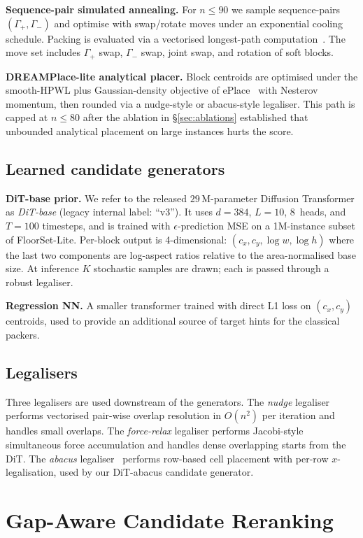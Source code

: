 \documentclass[nolineno]{ieeeaccess}
\begin{document}
\textbf{Sequence-pair simulated annealing.} For $n\le 90$ we sample
sequence-pairs $(\Gamma_+, \Gamma_-)$ and optimise with swap/rotate
moves under an exponential cooling schedule. Packing is evaluated via a
vectorised longest-path computation~\cite{murata1996sequence}. The
move set includes $\Gamma_+$ swap, $\Gamma_-$ swap, joint swap, and
rotation of soft blocks.

\textbf{DREAMPlace-lite analytical placer.} Block centroids are
optimised under the smooth-HPWL plus Gaussian-density objective of
ePlace~\cite{lu2015eplace} with Nesterov momentum, then rounded via a
nudge-style or abacus-style legaliser. This path is capped at $n\le 80$
after the ablation in \S\ref{sec:ablations} established that unbounded
analytical placement on large instances hurts the score.

\subsection{Learned candidate generators}
\textbf{DiT-base prior.} We refer to the released
$29\,\text{M}$-parameter Diffusion Transformer as \emph{DiT-base}
(legacy internal label: ``v3''). It uses
$d{=}384$, $L{=}10$, $8$~heads, and $T{=}100$ timesteps, and is trained with
$\epsilon$-prediction MSE on a 1M-instance subset of FloorSet-Lite.
Per-block output is 4-dimensional: $(c_x, c_y, \log\!w, \log\!h)$ where
the last two components are log-aspect ratios relative to the
area-normalised base size. At inference $K$ stochastic samples are
drawn; each is passed through a robust legaliser.

\textbf{Regression NN.} A smaller transformer trained with direct L1
loss on $(c_x, c_y)$ centroids, used to provide an additional source of
target hints for the classical packers.

\subsection{Legalisers}
Three legalisers are used downstream of the generators.
The \emph{nudge} legaliser performs vectorised pair-wise overlap
resolution in $O(n^2)$ per iteration and handles small overlaps.
The \emph{force-relax} legaliser performs Jacobi-style simultaneous
force accumulation and handles dense overlapping starts from the DiT.
The \emph{abacus} legaliser~\cite{spindler2008abacus} performs row-based
cell placement with per-row $x$-legalisation, used by our DiT-abacus
candidate generator.

\section{Gap-Aware Candidate Reranking}
\label{sec:rerank-calibration}
\end{document}
